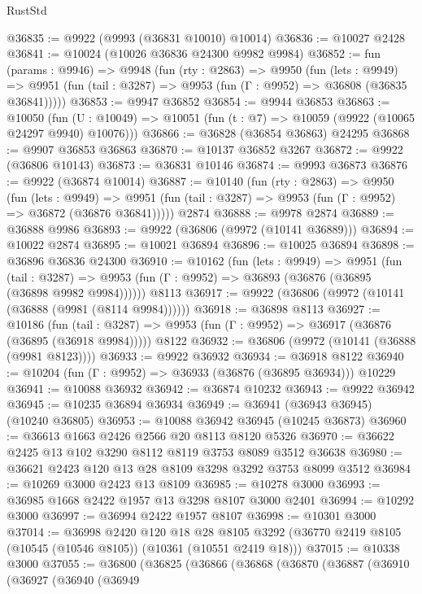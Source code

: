 \begin{lexlean}{RustStd}
\begin{coremodule}
@36835 := @9922 (@9993 (@36831 @10010) @10014)
@36836 := @10027 @2428
@36841 := @10024 (@10026 @36836 @24300 @9982 @9984)
@36852 := fun (params : @9946) =>
  @9948
    (fun (rty : @2863) =>
    @9950
      (fun (lets : @9949) =>
      @9951 (fun (tail : @3287) => @9953 (fun (Γ : @9952) => @36808 (@36835 @36841)))))
@36853 := @9947 @36852
@36854 := @9944 @36853
@36863 := @10050
    (fun (U : @10049) => @10051 (fun (t : @7) => @10059 (@9922 (@10065 @24297 @9940) @10076)))
@36866 := @36828 (@36854 @36863) @24295
@36868 := @9907 @36853 @36863
@36870 := @10137 @36852 @3267
@36872 := @9922 (@36806 @10143)
@36873 := @36831 @10146
@36874 := @9993 @36873
@36876 := @9922 (@36874 @10014)
@36887 := @10140
    (fun (rty : @2863) =>
    @9950
      (fun (lets : @9949) =>
      @9951 (fun (tail : @3287) => @9953 (fun (Γ : @9952) => @36872 (@36876 @36841)))))
    @2874
@36888 := @9978 @2874
@36889 := @36888 @9986
@36893 := @9922 (@36806 (@9972 (@10141 @36889)))
@36894 := @10022 @2874
@36895 := @10021 @36894
@36896 := @10025 @36894
@36898 := @36896 @36836 @24300
@36910 := @10162
    (fun (lets : @9949) =>
    @9951
      (fun (tail : @3287) =>
      @9953 (fun (Γ : @9952) => @36893 (@36876 (@36895 (@36898 @9982 @9984))))))
    @8113
@36917 := @9922 (@36806 (@9972 (@10141 (@36888 (@9981 (@8114 @9984))))))
@36918 := @36898 @8113
@36927 := @10186
    (fun (tail : @3287) => @9953 (fun (Γ : @9952) => @36917 (@36876 (@36895 (@36918 @9984)))))
    @8122
@36932 := @36806 (@9972 (@10141 (@36888 (@9981 @8123))))
@36933 := @9922 @36932
@36934 := @36918 @8122
@36940 := @10204 (fun (Γ : @9952) => @36933 (@36876 (@36895 @36934))) @10229
@36941 := @10088 @36932
@36942 := @36874 @10232
@36943 := @9922 @36942
@36945 := @10235 @36894 @36934
@36949 := @36941 (@36943 @36945) (@10240 @36805)
@36953 := @10088 @36942 @36945 (@10245 @36873)
@36960 := @36613 @1663 @2426 @2566 @20 @8113 @8120 @5326
@36970 := @36622 @2425 @13 @102 @3290 @8112 @8119 @3753 @8089 @3512 @36638
@36980 := @36621 @2423 @120 @13 @28 @8109 @3298 @3292 @3753 @8099 @3512
@36984 := @10269 @3000 @2423 @13 @8109
@36985 := @10278 @3000
@36993 := @36985 @1668 @2422 @1957 @13 @3298 @8107 @3000 @2401
@36994 := @10292 @3000
@36997 := @36994 @2422 @1957 @8107
@36998 := @10301 @3000
@37014 := @36998
    @2420
    @120
    @18
    @28
    @8105
    @3292
    (@36770 @2419 @8105 (@10545 (@10546 @8105)) (@10361 (@10551 @2419 @18)))
@37015 := @10338 @3000
@37055 := @36800
    (@36825
      (@36866
        (@36868
          (@36870
            (@36887
              (@36910
                (@36927
                  (@36940
                    (@36949

\end{coremodule}
\end{lexlean}
